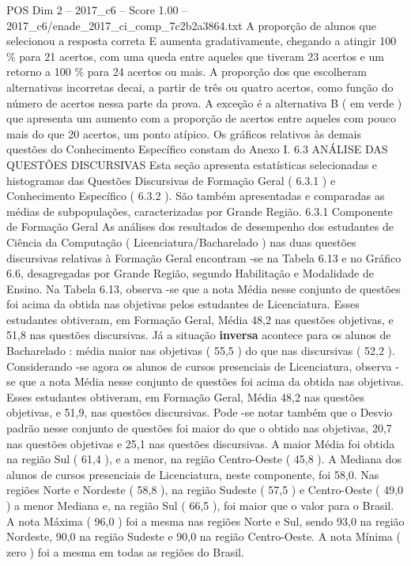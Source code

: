 \begin{textsample}{POS Dim 2 – 2017\_c6 – Score 1.00 – 2017\_c6/enade\_2017\_ci\_comp\_7c2b2a3864.txt}
A proporção de alunos que selecionou a resposta correta E aumenta gradativamente, chegando a atingir 100 \% para 21 acertos, com uma queda entre aqueles que tiveram 23 acertos e um retorno a 100 \% para 24 acertos ou mais.
A proporção dos que escolheram alternativas incorretas decai, a partir de três ou quatro acertos, como função do número de acertos nessa parte da prova.
A exceção é a alternativa B ( em verde ) que apresenta um aumento com a proporção de acertos entre aqueles com pouco mais do que 20 acertos, um ponto atípico.
Os gráficos relativos às demais questões do Conhecimento Específico constam do Anexo I. 6.3 ANÁLISE DAS QUESTÕES DISCURSIVAS Esta seção apresenta estatísticas selecionadas e histogramas das Questões Discursivas de Formação Geral ( 6.3.1 ) e Conhecimento Específico ( 6.3.2 ).
São também apresentadas e comparadas as médias de subpopulações, caracterizadas por Grande Região. 6.3.1 Componente de Formação Geral As análises dos resultados de desempenho dos estudantes de Ciência da Computação ( Licenciatura/Bacharelado ) nas duas questões discursivas relativas à Formação Geral encontram -se na Tabela 6.13 e no Gráfico 6.6, desagregadas por Grande Região, segundo Habilitação e Modalidade de Ensino.
Na Tabela 6.13, observa -se que a nota Média nesse conjunto de questões foi acima da obtida nas objetivas pelos estudantes de Licenciatura.
Esses estudantes obtiveram, em Formação Geral, Média 48,2 nas questões objetivas, e 51,8 nas questões discursivas.
Já a situação \textbf{inversa} acontece para os alunos de Bacharelado : média maior nas objetivas ( 55,5 ) do que nas discursivas ( 52,2 ).
Considerando -se agora os alunos de cursos presenciais de Licenciatura, observa -se que a nota Média nesse conjunto de questões foi acima da obtida nas objetivas.
Esses estudantes obtiveram, em Formação Geral, Média 48,2 nas questões objetivas, e 51,9, nas questões discursivas.
Pode -se notar também que o Desvio padrão nesse conjunto de questões foi maior do que o obtido nas objetivas, 20,7 nas questões objetivas e 25,1 nas questões discursivas.
A maior Média foi obtida na região Sul ( 61,4 ), e a menor, na região Centro-Oeste ( 45,8 ).
A Mediana dos alunos de cursos presenciais de Licenciatura, neste componente, foi 58,0.
Nas regiões Norte e Nordeste ( 58,8 ), na região Sudeste ( 57,5 ) e Centro-Oeste ( 49,0 ) a menor Mediana e, na região Sul ( 66,5 ), foi maior que o valor para o Brasil.
A nota Máxima ( 96,0 ) foi a mesma nas regiões Norte e Sul, sendo 93,0 na região Nordeste, 90,0 na região Sudeste e 90,0 na região Centro-Oeste.
A nota Mínima ( zero ) foi a mesma em todas as regiões do Brasil.

\end{textsample}
